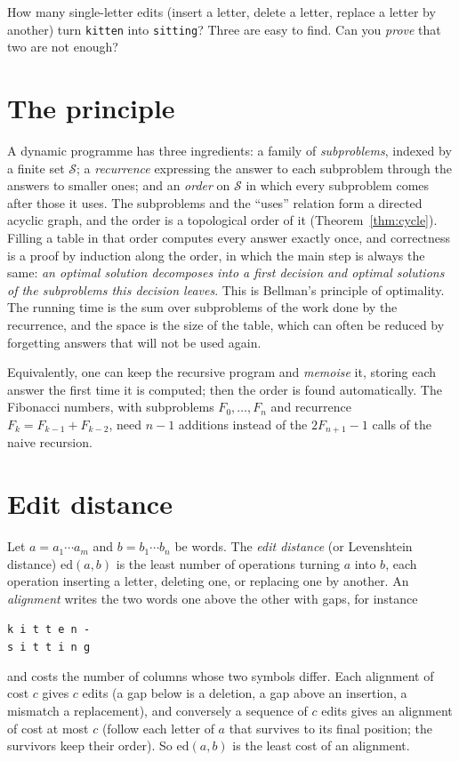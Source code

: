 \begin{think}
How many single-letter edits (insert a letter, delete a letter, replace a letter by another) turn \texttt{kitten} into \texttt{sitting}? Three are easy to find. Can you
\emph{prove} that two are not enough?
\end{think}

\section{The principle}\label{sec:dpprinciple}

A dynamic programme has three ingredients: a family of \emph{subproblems}, indexed by a finite set $\mathcal S$; a \emph{recurrence} expressing the answer to each subproblem
through the answers to smaller ones; and an \emph{order} on $\mathcal S$ in which every subproblem comes after those it uses. The subproblems and the ``uses'' relation
form a directed acyclic graph, and the order is a topological order of it (Theorem~\ref{thm:cycle}). Filling a table in that order computes every answer exactly once,
and correctness is a proof by induction along the order, in which the main step is always the same: \emph{an optimal solution decomposes into a first decision and optimal
solutions of the subproblems this decision leaves}. This is Bellman's principle of optimality. The running time is the sum over subproblems of the work done by the
recurrence, and the space is the size of the table, which can often be reduced by forgetting answers that will not be used again.

Equivalently, one can keep the recursive program and \emph{memoise} it, storing each answer the first time it is computed; then the order is found automatically.
The Fibonacci numbers, with subproblems $F_0,\dots,F_n$ and recurrence $F_k=F_{k-1}+F_{k-2}$, need $n-1$ additions instead of the $2F_{n+1}-1$ calls of the naive recursion.

\section{Edit distance}\label{sec:edit}

Let $a=a_1\cdots a_m$ and $b=b_1\cdots b_n$ be words. The \emph{edit distance} (or Levenshtein distance) $\mathrm{ed}(a,b)$ is the least number of operations turning $a$ into $b$,
each operation inserting a letter, deleting one, or replacing one by another. An \emph{alignment} writes the two words one above the other with gaps, for instance
\begin{center}
\texttt{k i t t e n -}\\
\texttt{s i t t i n g}
\end{center}
and costs the number of columns whose two symbols differ. Each alignment of cost $c$ gives $c$ edits (a gap below is a deletion, a gap above an insertion, a mismatch a replacement), and conversely a
sequence of $c$ edits gives an alignment of cost at most $c$ (follow each letter of $a$ that survives to its final position; the survivors keep their order). So $\mathrm{ed}(a,b)$ is the least cost of an alignment.

